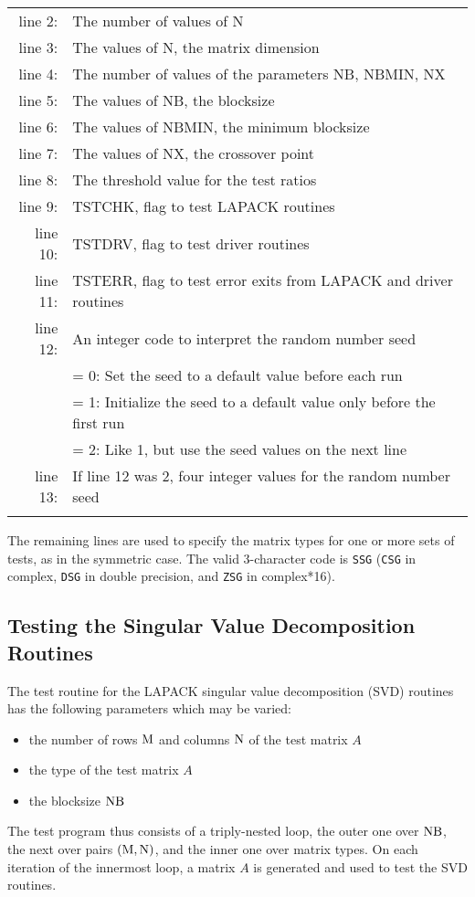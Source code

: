 \begin{tabular}{r l}
\\
line 2: & The number of values of N \\
line 3: & The values of N, the matrix dimension \\
line 4: & The number of values of the parameters NB, NBMIN, NX \\
line 5: & The values of NB, the blocksize \\
line 6: & The values of NBMIN, the minimum blocksize \\
line 7: & The values of NX, the crossover point \\
line 8: & The threshold value for the test ratios \\
line 9: & TSTCHK, flag to test LAPACK routines \\
line 10:& TSTDRV, flag to test driver routines \\
line 11:& TSTERR, flag to test error exits from LAPACK and driver
routines \\
line 12: & An integer code to interpret the random number seed \\
        & = 0:  Set the seed to a default value before each run \\
        & = 1:  Initialize the seed to a default value only before the
first run \\
        & = 2:  Like 1, but use the seed values on the next line \\
line 13:& If line 12 was 2, four integer values for the random number
seed \\
        &
\end{tabular}

\noindent
The remaining lines are used to specify the matrix types for one
or more sets of tests, as in the symmetric case.
The valid 3-character code is {\tt SSG} ({\tt CSG}
in complex, {\tt DSG} in double precision, and {\tt ZSG} in
complex*16).

\subsection{Testing the Singular Value Decomposition Routines}

\dent
The test routine for the LAPACK singular value decomposition (SVD)
routines has the following parameters which may be varied:
\begin{itemize}
\item	the number of rows ${\rm M}$ and columns ${\rm N}$ of the test matrix $A$
\item	the type of the test matrix $A$
\item	the blocksize ${\rm NB}$
\end{itemize}
The test program thus consists of a triply-nested
loop, the outer one over ${\rm NB}$, the next
over pairs $({\rm M},{\rm N})$,
and the inner one over matrix types.
On each iteration of the innermost loop,
a matrix $A$ is generated and used
to test the SVD routines.

